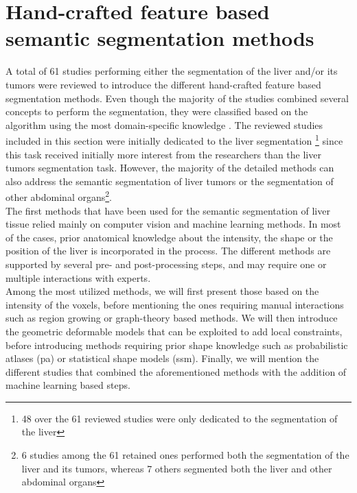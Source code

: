 \section{Hand-crafted feature based semantic segmentation methods}

A total of 61 studies performing either the segmentation of the liver and/or its tumors 
were reviewed to introduce the different hand-crafted feature based segmentation methods. 
Even though the majority of the studies 
 combined several concepts to perform the segmentation, they were classified 
 based on the algorithm using the most domain-specific knowledge \cite{Moghbel2018}.
The reviewed studies included in this section were initially dedicated
 to the liver segmentation \footnote{48 over the 61 reviewed studies were only dedicated to
 the segmentation of the liver} since this task received initially more interest from the researchers than the liver tumors segmentation task. However, 
 the majority of the detailed methods can also address the semantic 
 segmentation of liver tumors or the segmentation of other abdominal 
 organs\footnote{6 studies among the 61 retained ones performed both the 
 segmentation of the liver and its tumors, whereas 7 others segmented both the liver and other abdominal organs}. \\
The first methods that have been used for the semantic segmentation of
liver tissue relied mainly on computer vision and machine
learning methods. In most of the cases, prior anatomical knowledge about
the intensity, the shape or the position of the liver is incorporated in
the process. The different methods are supported by several pre- and
post-processing steps, and may require one or multiple interactions with
experts.\\
Among the most utilized methods, we will first present those based on
the intensity of the voxels, before mentioning the ones requiring manual
interactions such as region growing or graph-theory based methods. We will 
then introduce the geometric deformable models that can be exploited to add 
local constraints, before introducing methods 
requiring prior shape knowledge such as
probabilistic atlases (\ac{pa}) or statistical shape models (\ac{ssm}).
Finally, we will mention the different studies that combined the
aforementioned methods with the addition of machine learning based steps.

